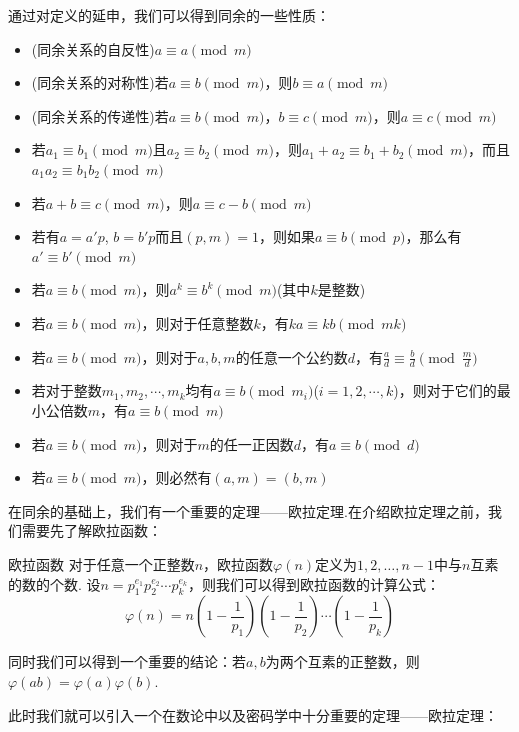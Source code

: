 \documentclass{book}
\numberwithin{equation}{subsubsection}
\begin{document}
通过对定义的延申，我们可以得到同余的一些性质：
\begin{itemize}
    \item (同余关系的自反性)$a\equiv a\pmod{m}$
    \item (同余关系的对称性)若$a\equiv b\pmod{m}$，则$b\equiv a\pmod{m}$
    \item (同余关系的传递性)若$a\equiv b\pmod{m}$，$b\equiv c\pmod{m}$，则$a\equiv c\pmod{m}$
    \item 若$a_1\equiv b_1\pmod{m}$且$a_2\equiv b_2\pmod{m}$，则$a_1+a_2\equiv b_1+b_2\pmod{m}$，而且$a_1a_2\equiv b_1b_2\pmod{m}$
    \item 若$a+b\equiv c\pmod{m}$，则$a\equiv c-b\pmod{m}$
    \item 若有$a=a'p$, $b=b'p$而且$(p,m)=1$，则如果$a\equiv b\pmod{p}$，那么有$a'\equiv b'\pmod{m}$
    \item 若$a\equiv b\pmod{m}$，则$a^k\equiv b^k\pmod{m}$(其中$k$是整数)
    \item 若$a\equiv b\pmod{m}$，则对于任意整数$k$，有$ka\equiv kb\pmod{mk}$
    \item 若$a\equiv b\pmod{m}$，则对于$a,b,m$的任意一个公约数$d$，有$\frac{a}{d}\equiv \frac{b}{d}\pmod{\frac{m}{d}}$
    \item 若对于整数$m_1,m_2,\cdots,m_k$均有$a\equiv b\pmod{m_i}$($i=1,2,\cdots,k$)，则对于它们的最小公倍数$m$，有$a\equiv b\pmod{m}$
    \item 若$a\equiv b\pmod{m}$，则对于$m$的任一正因数$d$，有$a\equiv b\pmod{d}$
    \item 若$a\equiv b\pmod{m}$，则必然有$(a,m)=(b,m)$
\end{itemize}\par
在同余的基础上，我们有一个重要的定理——欧拉定理.在介绍欧拉定理之前，我们需要先了解欧拉函数：

\begin{concept}{欧拉函数}
对于任意一个正整数$n$，欧拉函数$\varphi(n)$定义为$1,2,\ldots,n-1$中与$n$互素的数的个数.
设$n=p_1^{e_1}p_2^{e_2}\cdots p_k^{e_k}$，则我们可以得到欧拉函数的计算公式：
\begin{equation}
    \varphi(n)=n\left(1-\frac{1}{p_1}\right)\left(1-\frac{1}{p_2}\right)\cdots\left(1-\frac{1}{p_k}\right)
    \nonumber
\end{equation}
\end{concept}

同时我们可以得到一个重要的结论：若$a,b$为两个互素的正整数，则$\varphi(ab)=\varphi(a)\varphi(b)$.\par
此时我们就可以引入一个在数论中以及密码学中十分重要的定理——欧拉定理：
\end{document}
